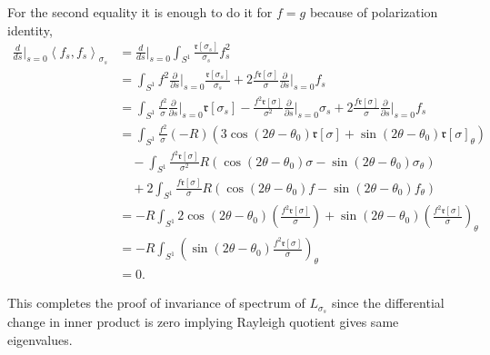 \documentclass[12pt,a4paper]{article}
\begin{document}
For the second equality it is enough to do it for $ f=g $ because of polarization identity,\begin{align*}
   \frac{d}{ds}\bigg|_{s=0} \left< f_{s}, f_{s} \right>_{\sigma_{s}} & = \frac{d}{ds}\bigg|_{s=0} \int_{S^{1}} \frac{ \mathfrak{r}[\sigma_{s}]}{\sigma_{s}}f_{s}^{2} \\
   & = \int_{S^{1}} f^{2}\frac{\partial}{\partial s}\bigg|_{s=0}\frac{ \mathfrak{r}[\sigma_{s}]}{\sigma_{s}} + 2\frac{f \mathfrak{r}[\sigma]}{\sigma}  \frac{\partial}{\partial s}\bigg|_{s=0}f_{s} \\
   & = \int_{S^{1}} \frac{f^{2}}{\sigma}\frac{\partial}{\partial s}\bigg|_{s=0} \mathfrak{r}[\sigma_{s}] - \frac{f^{2}\mathfrak{r}[\sigma]}{\sigma^{2}} \frac{\partial}{\partial s}\bigg|_{s=0} \sigma_{s} + 2\frac{f \mathfrak{r}[\sigma]}{\sigma}  \frac{\partial}{\partial s}\bigg|_{s=0}f_{s} \\
   & = \int_{S^{1}} \frac{f^{2}}{\sigma}(-R)(3\cos(2 \theta- \theta_{0}) \mathfrak{r}[\sigma] + \sin(2 \theta- \theta_{0}) \mathfrak{r}[\sigma]_{\theta}) \\
   & \quad -\int_{S^{1}} \frac{f^{2} \mathfrak{r}[\sigma]}{\sigma^{2}}R(\cos(2 \theta-\theta_{0})\sigma - \sin(2 \theta-\theta_{0})\sigma_{\theta}) \\
   & \quad + 2 \int_{S^{1}} \frac{f \mathfrak{r}[\sigma]}{\sigma}R(\cos(2 \theta - \theta_{0})f -\sin(2 \theta-\theta_{0})f_{\theta}) \\
   & = -R\int_{S^{1}} 2 \cos(2 \theta-\theta_{0}) \left( \frac{f^{2} \mathfrak{r}[\sigma]}{\sigma}\right)  + \sin(2 \theta- \theta_{0}) \left( \frac{f^{2} \mathfrak{r}[\sigma]}{\sigma}\right)_{\theta} \\
   & = - R \int_{S^{1}} \left(\sin(2 \theta-\theta_{0}) \frac{f^{2} \mathfrak{r}[\sigma]}{\sigma}\right)_{\theta} \\
   & = 0. 
\end{align*}

This completes the proof of invariance of spectrum of $ L_{\sigma_{s}} $ since the differential change in inner product is zero implying Rayleigh quotient gives same eigenvalues. 
\end{document}
